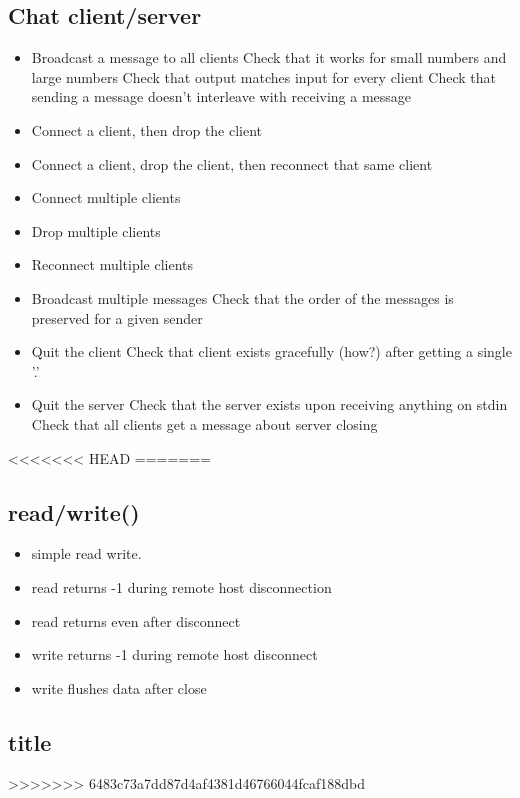 \documentclass[]{article}
\begin{document}
\subsection{Chat client/server}
\begin{itemize}
	\item Broadcast a message to all clients
	\subitem Check that it works for small numbers and large numbers
	\subitem Check that output matches input for every client
	\subitem Check that sending a message doesn't interleave with receiving a message
	\item Connect a client, then drop the client
	\item Connect a client, drop the client, then reconnect that same client
	\item Connect multiple clients
	\item Drop multiple clients
	\item Reconnect multiple clients
	\item Broadcast multiple messages
	\subitem Check that the order of the messages is preserved for a given sender
	\item Quit the client
	\subitem Check that client exists gracefully (how?) after getting a single '.'
	\item Quit the server
	\subitem Check that the server exists upon receiving anything on stdin
	\subitem Check that all clients get a message about server closing
	
\end{itemize}
<<<<<<< HEAD
=======
\subsection{read/write()}
\begin{itemize}
	\item simple read write.
	\item read returns -1 during remote host disconnection 
	\item read returns even after disconnect
	\item write returns -1 during remote host disconnect
	\item write flushes data after close
\end{itemize}

\subsection{title}

>>>>>>> 6483c73a7dd87d4af4381d46766044fcaf188dbd
\end{document}
